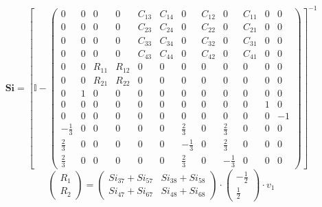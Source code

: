 \documentclass[10pt]{article} \usepackage{amsmath} \usepackage{bbold}
\begin{document}
\[ \mathbf{Si} = \left[ \mathbb{I}  -
\left(\begin{array}{cccccccccccc} 0 & 0 & 0 & 0 & C_{13} & C_{14} & 0
& C_{12} & 0 & C_{11} & 0 & 0 \\ 0 & 0 & 0 & 0 & C_{23} & C_{24} & 0 &
C_{22} & 0 & C_{21} & 0 & 0 \\ 0 & 0 & 0 & 0 & C_{33} & C_{34} & 0 &
C_{32} & 0 & C_{31} & 0 & 0 \\ 0 & 0 & 0 & 0 & C_{43} & C_{44} & 0 &
C_{42} & 0 & C_{41} & 0 & 0 \\ 0 & 0 & R_{11} & R_{12} & 0 & 0 & 0 & 0
& 0 & 0 & 0 & 0 \\ 0 & 0 & R_{21} & R_{22} & 0 & 0 & 0 & 0 & 0 & 0 & 0
& 0 \\ 0 & 1 & 0 & 0 & 0 & 0 & 0 & 0 & 0 & 0 & 0 & 0 \\ 0 & 0 & 0 & 0
& 0 & 0 & 0 & 0 & 0 & 0 & 1 & 0 \\ 0 & 0 & 0 & 0 & 0 & 0 & 0 & 0 & 0 &
0 & 0 & -1 \\ -\frac{1}{3} & 0 & 0 & 0 & 0 & 0 & \frac{2}{3} & 0 &
\frac{2}{3} & 0 & 0 & 0 \\ \frac{2}{3} & 0 & 0 & 0 & 0 & 0 &
-\frac{1}{3} & 0 & \frac{2}{3} & 0 & 0 & 0 \\ \frac{2}{3} & 0 & 0 & 0
& 0 & 0 & \frac{2}{3} & 0 & -\frac{1}{3} & 0 & 0 & 0
\end{array}\right) \right]^{-1} \]
\[ \left(\begin{array}{c} R_{1} \\ R_{2}
\end{array}\right)=\left(\begin{array}{cc} Si_{37} + Si_{57} & Si_{38}
+ Si_{58} \\ Si_{47} + Si_{67} & Si_{48} + Si_{68}
\end{array}\right)\cdot \left(\begin{array}{c} -\frac{1}{2} \\
\frac{1}{2} \end{array}\right)\cdot v_{1} \]
\end{document}
